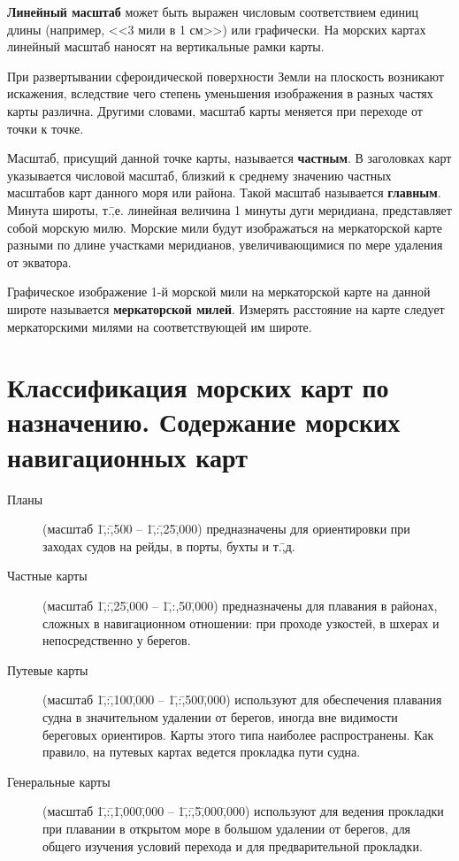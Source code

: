 \documentclass[a4paper, 12pt, twoside, final, book, russian, fittopage, cyremdash]{ncc}
\begin{document}
\textbf{Линейный масштаб} может быть выражен числовым соответствием единиц длины (например, <<3 мили в 1 см>>) или графически. На морских картах линейный масштаб наносят на вертикальные рамки карты. 

При развертывании сфероидической поверхности Земли на плоскость возникают искажения, вследствие чего степень уменьшения изображения в разных частях карты различна. Другими словами, масштаб карты меняется при переходе от точки к точке. 

Масштаб, присущий данной точке карты, называется \textbf{частным}. В заголовках карт указывается числовой масштаб, близкий к среднему значению частных масштабов карт данного моря или района. Такой масштаб называется \textbf{главным}. Минута широты, т.\=,е. линейная величина 1 минуты дуги меридиана, представляет собой морскую милю. Морские мили будут изображаться на меркаторской карте разными по длине участками меридианов, увеличивающимися по мере удаления от экватора.

 Графическое изображение 1-й морской мили на меркаторской карте на данной широте называется \textbf{меркаторской милей}. Измерять расстояние на карте следует меркаторскими милями на соответствующей им широте. 

\section{Классификация морских карт по назначению. Содержание морских навигационных карт}

\begin{description} 
\item [Планы] (масштаб 1\=,:\=,500 \--- 1\=,:\=,25\=,000) предназначены для ориентировки при заходах судов на рейды, в порты, бухты и т.\=,д. 
\item [Частные карты] (масштаб 1\=,:\=,25\=,000 \--- 1\=,:\-,50\=,000) предназначены для плавания в районах, сложных в навигационном отношении: при проходе узкостей, в шхерах и непосредственно у берегов. 
\item [Путевые карты] (масштаб 1\=,:\=,100\=,000 \--- 1\=,:\=,500\=,000) используют для обеспечения плавания судна в значительном удалении от берегов, иногда вне видимости береговых ориентиров. Карты этого типа наиболее распространены. Как правило, на путевых картах ведется прокладка пути судна. 
\item [Генеральные карты] (масштаб 1\=,:\=,1\=,000\=,000 \--- 1\=,:\=,5\=,000\=,000) используют для ведения прокладки при плавании в открытом море в большом удалении от берегов, для общего изучения условий перехода и для предварительной прокладки. 
\end{description}
\end{document}
